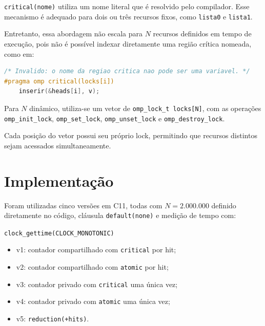 \documentclass[11pt,letterpaper]{article}
\begin{document}
\texttt{critical(nome)} utiliza um nome literal que é resolvido pelo
compilador. Esse mecanismo é adequado para dois ou três recursos fixos,
como \texttt{lista0} e \texttt{lista1}.

Entretanto, essa abordagem não escala para $N$ recursos definidos em
tempo de execução, pois não é possível indexar diretamente uma região
crítica nomeada, como em:

\begin{lstlisting}[language=C,caption={Regiao critica nomeada nao indexavel}]
/* Invalido: o nome da regiao critica nao pode ser uma variavel. */
#pragma omp critical(locks[i])
    inserir(&heads[i], v);
\end{lstlisting}

Para $N$ dinâmico, utiliza-se um vetor de
\texttt{omp\_lock\_t locks[N]}, com as operações
\texttt{omp\_init\_lock}, \texttt{omp\_set\_lock},
\texttt{omp\_unset\_lock} e \texttt{omp\_destroy\_lock}.

Cada posição do vetor possui seu próprio lock, permitindo que recursos
distintos sejam acessados simultaneamente.

\section{Implementação}

Foram utilizadas cinco versões em C11, todas com $N=2.000.000$
definido diretamente no código, cláusula \texttt{default(none)} e
medição de tempo com:

\begin{center}
\texttt{clock\_gettime(CLOCK\_MONOTONIC)}
\end{center}

\begin{itemize}

\item v1: contador compartilhado com \texttt{critical} por hit;

\item v2: contador compartilhado com \texttt{atomic} por hit;

\item v3: contador privado com \texttt{critical} uma única vez;

\item v4: contador privado com \texttt{atomic} uma única vez;

\item v5: \texttt{reduction(+\:hits)}.

\end{itemize}
\end{document}
